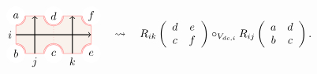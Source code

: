 \begin{equation}
    \begin{tikzpicture}[scale=0.6, baseline=(x.base)]
        \node (x) at (0,0) {\vphantom{x}};
        
        \draw[color=red!50, fill=brown!10] (-1,-1) rectangle (3,1);
        \draw[color=red!50, dotted] (1,-1) -- (1,1);
        
        \fill[color=white] (-1,1) circle (0.5);  \node (a) at (-1,1) {$a$};
        \draw[draw=red!50, double]  (-1,0.5) arc (-90:0:0.5);
        \fill[color=white] (-1,-1) circle (0.5);  \node (b) at (-1,-1) {$b$};
        \draw[draw=red!50, double]  (-1,-0.5) arc (90:0:0.5);
        \fill[color=white] (1,-1) circle (0.5);  \node (c) at (1,-1) {$c$};
        \draw[draw=red!50, double]  (1.5,-1) arc (0:180:0.5);
        \fill[color=white] (1,1) circle (0.5);  \node (d) at (1,1) {$d$};
        \draw[draw=red!50, double]  (1.5,1) arc (0:-180:0.5);
        \fill[color=white] (3,-1) circle (0.5);  \node (e) at (3,-1) {$e$};
        \draw[draw=red!50, double]  (3,-0.5) arc (90:180:0.5);
        \fill[color=white] (3,1) circle (0.5);  \node (f) at (3,1) {$f$};
        \draw[draw=red!50, double]  (3,0.5) arc (-90:-180:0.5);
        
        \draw[thick, ->] (-1,0) node[left] {$i$} -- (3,0);
        \draw[thick, ->] (0,-1) node[below] {$j$} -- (0,1);
        \draw[thick, ->] (2,-1) node[below] {$k$} -- (2,1);
        
    \end{tikzpicture}
  \quad \rightsquigarrow \quad
R_{ik}\left(%
  \begin{array}{cc}
        d & e\\
        c & f
  \end{array}%
\right)
  \circ_{V_{dc,i}}
R_{ij}\left(%
  \begin{array}{cc}
        a & d\\
        b & c
  \end{array}%
\right).
\end{equation}

